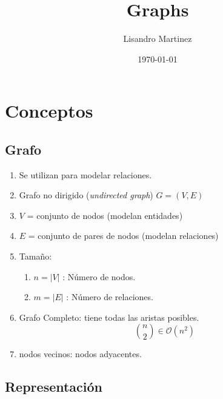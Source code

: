 \documentclass[12pt, fleqn]{article}
\title{Graphs}
\author{Lisandro Martinez}
\date{\today}
\theoremstyle{definition}
\begin{document}
    \maketitle
    \section{Conceptos}
        \subsection{Grafo}
            \begin{enumerate}
                \item Se utilizan para modelar relaciones.
                \item Grafo no dirigido (\emph{undirected graph}) $G = (V,E)$
                \item $V$ = conjunto de nodos (modelan entidades)
                \item $E$ = conjunto de pares de nodos (modelan relaciones)
                \item Tamaño:
                    \begin{enumerate}
                        \item $n = |V|$ : Número de nodos.
                        \item $m = |E|$ : Número de relaciones.
                    \end{enumerate}
                \item Grafo Completo: tiene todas las aristas posibles. \begin{displaymath}
                    {n \choose 2} \in \mathcal{O}(n^2)
                \end{displaymath}
                \item nodos vecinos: nodos adyacentes.
            \end{enumerate}
        \subsection{Representación}
\end{document}
